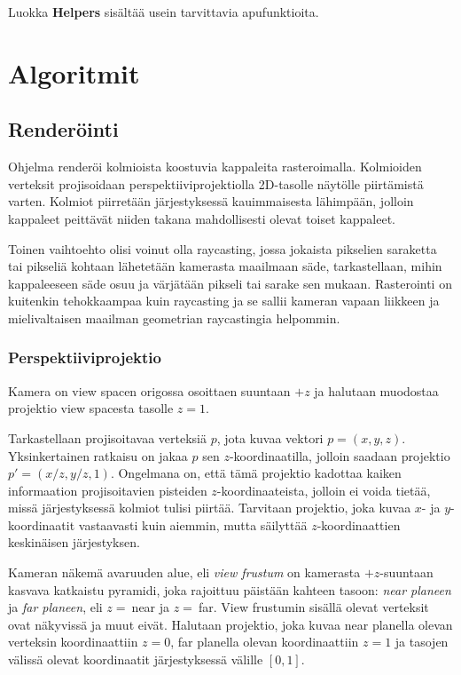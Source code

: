\documentclass[12pt] {article}
\begin{document}
Luokka \textbf{Helpers} sisältää usein tarvittavia apufunktioita.

\section {Algoritmit}

\subsection {Renderöinti}

Ohjelma renderöi kolmioista koostuvia kappaleita rasteroimalla. Kolmioiden verteksit projisoidaan perspektiiviprojektiolla 2D-tasolle näytölle piirtämistä varten. Kolmiot piirretään järjestyksessä kauimmaisesta lähimpään, jolloin kappaleet peittävät niiden takana mahdollisesti olevat toiset kappaleet.

Toinen vaihtoehto olisi voinut olla raycasting, jossa jokaista pikselien saraketta tai pikseliä kohtaan lähetetään kamerasta maailmaan säde, tarkastellaan, mihin kappaleeseen säde osuu ja värjätään pikseli tai sarake sen mukaan. Rasterointi on kuitenkin tehokkaampaa kuin raycasting ja se sallii kameran vapaan liikkeen ja mielivaltaisen maailman geometrian raycastingia helpommin.

\subsubsection {Perspektiiviprojektio}

Kamera on view spacen origossa osoittaen suuntaan $+z$ ja halutaan muodostaa projektio view spacesta tasolle $z = 1$. 

Tarkastellaan projisoitavaa verteksiä $p$, jota kuvaa vektori $p = (x, y, z)$. Yksinkertainen ratkaisu on jakaa $p$ sen $z$-koordinaatilla, jolloin saadaan projektio $p' = (x/z, y/z, 1)$. Ongelmana on, että tämä projektio kadottaa kaiken informaation projisoitavien pisteiden $z$-koordinaateista, jolloin ei voida tietää, missä järjestyksessä kolmiot tulisi piirtää. Tarvitaan projektio, joka kuvaa $x$- ja $y$-koordinaatit vastaavasti kuin aiemmin, mutta säilyttää $z$-koordinaattien keskinäisen järjestyksen.

Kameran näkemä avaruuden alue, eli \textit{view frustum} on kamerasta $+z$-suuntaan kasvava katkaistu pyramidi, joka rajoittuu päistään kahteen tasoon: \textit{near planeen} ja \textit{far planeen}, eli $z =\ $near ja $z =\ $far. View frustumin sisällä olevat verteksit ovat näkyvissä ja muut eivät. Halutaan projektio, joka kuvaa near planella olevan verteksin koordinaattiin $z = 0$, far planella olevan koordinaattiin $z = 1$ ja tasojen välissä olevat koordinaatit järjestyksessä välille $[0, 1]$.
\end{document}
